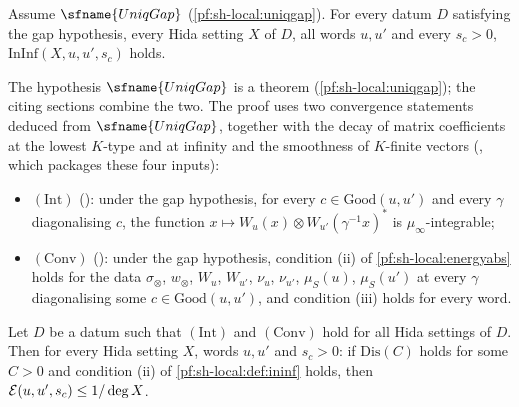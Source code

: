 \begin{theorem}\label{pf:sh-local:realobj}
Assume $\sfname{UniqGap}$ (\cref{pf:sh-local:uniqgap}). For every datum $D$ satisfying the gap hypothesis, every Hida
setting $X$ of $D$, all words $u,u'$ and every $s_c>0$, $\mathrm{InInf}(X,u,u',s_c)$ holds.
\end{theorem}

The hypothesis $\sfname{UniqGap}$ is a theorem (\cref{pf:sh-local:uniqgap}); the citing sections combine the two.
The proof uses two convergence statements deduced from $\sfname{UniqGap}$, together with the decay of matrix
coefficients at the lowest $K$-type and at infinity and the smoothness of $K$-finite vectors
(, which packages these four inputs):
\begin{itemize}
\item $(\mathrm{Int})$ (): under the gap
hypothesis, for every $c\in\mathrm{Good}(u,u')$ and every $\gamma$ diagonalising $c$, the function
$x\mapsto W_u(x)\otimes W_{u'}(\gamma^{-1}x)^*$ is $\mu_\infty$-integrable;
\item $(\mathrm{Conv})$ (): under the gap hypothesis,
condition (ii) of \cref{pf:sh-local:energyabs} holds for the data $\sigma_\otimes$, $w_\otimes$, $W_u$, $W_{u'}$,
$\nu_u$, $\nu_{u'}$, $\mu_S(u)$, $\mu_S(u')$ at every $\gamma$ diagonalising some $c\in\mathrm{Good}(u,u')$, and
condition (iii) holds for every word.
\end{itemize}

\begin{proposition}\label{pf:sh-local:energystep}
Let $D$ be a datum such that $(\mathrm{Int})$ and $(\mathrm{Conv})$ hold for all Hida settings of $D$. Then for every
Hida setting $X$, words $u,u'$ and $s_c>0$: if $\mathrm{Dis}(C)$ holds for some $C>0$ and condition (ii) of
\cref{pf:sh-local:def:ininf} holds, then $\mathcal{E}(u,u',s_c)\le1/\deg X$.
\end{proposition}


